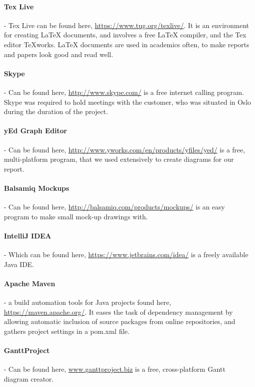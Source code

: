\documentclass[../document]{subfiles}
\begin{document}
\paragraph{Tex Live} - Tex Live can be found here, \url{https://www.tug.org/texlive/}. It is an environment for creating LaTeX documents, and involves a free LaTeX compiler, and the Tex editor TeXworks. LaTeX documents are used in academics often, to make reports and papers look good and read well.

\paragraph{Skype} - Can be found here, \url{http://www.skype.com/} is a free internet calling program. Skype was required to hold meetings with the customer, who was situated in Oslo during the duration of the project.

\paragraph{yEd Graph Editor} - Can be found here, \url{http://www.yworks.com/en/products/yfiles/yed/} is a free, multi-platform program, that we used extensively to create diagrams for our report.

\paragraph{Balsamiq Mockups} - Can be found here, \url{http://balsamiq.com/products/mockups/} is an easy program to make small mock-up drawings with. 

\paragraph{IntelliJ IDEA} - Which can be found here, \url{https://www.jetbrains.com/idea/} is a freely available \gls{Java} IDE.

\paragraph{Apache Maven} - a build automation tools for \gls{Java} projects found here, \url{https://maven.apache.org/}. It eases the task of dependency management by allowing automatic inclusion of source packages from online repositories, and gathers project settings in a pom.xml file.

\paragraph{GanttProject} - Can be found here, \url{www.ganttproject.biz} is a free, cross-platform Gantt diagram creator.
\end{document}
